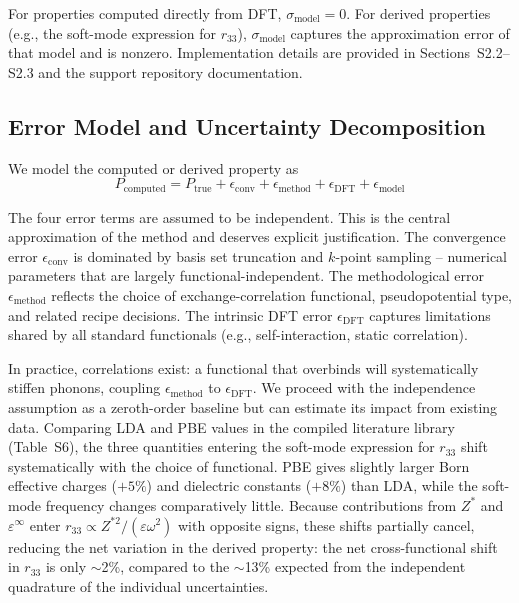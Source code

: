 \documentclass[twocolumn,superscriptaddress,amsmath,amssymb,longbibliography]{revtex4-2}
\newcommand{\conv}{\mathrm{conv}}
\newcommand{\meth}{\mathrm{method}}
\begin{document}
For properties computed directly from DFT,
$\sigma_{\mathrm{model}} = 0$. For derived properties (e.g., the soft-mode expression for $r_{33}$),
$\sigma_{\mathrm{model}}$ captures the approximation error of that model
and is nonzero. Implementation details are provided in  Sections~S2.2--S2.3 and the support repository documentation.

\subsection{Error Model and Uncertainty Decomposition}
\label{sec:decomposition}

We model the computed or derived property
as \cite{JCGM2008_GUM}
\begin{equation}
    P_{\mathrm{computed}} = P_{\mathrm{true}} + \epsilon_\conv + \epsilon_\meth + \epsilon_{\mathrm{DFT}} + \epsilon_{\mathrm{model}}
    \label{eq:error_model}
\end{equation}

The four error terms are assumed to be independent. This is
the central approximation of the method and deserves explicit
justification.
The convergence error $\epsilon_\conv$ is dominated by basis set truncation
and $k$-point sampling -- numerical parameters that are largely
functional-independent. The methodological error $\epsilon_\meth$ reflects
the choice of exchange-correlation functional, pseudopotential type, and
related recipe decisions. The intrinsic DFT error $\epsilon_{\mathrm{DFT}}$
captures limitations shared by all standard functionals (e.g.,
self-interaction, static correlation).

In practice, correlations exist:
a functional that overbinds will systematically stiffen phonons, coupling
$\epsilon_\meth$ to $\epsilon_{\mathrm{DFT}}$. We proceed with the
independence assumption as a zeroth-order baseline but can estimate its
impact from existing data. Comparing LDA and PBE values in the compiled literature
library (Table~S6), the three quantities entering the soft-mode expression for $r_{33}$ shift systematically with the choice of functional. PBE gives slightly larger Born effective charges ($+5\%$) and dielectric constants ($+8\%$) than LDA, while the soft-mode frequency changes comparatively little.  Because contributions from $Z^*$ and $\varepsilon^\infty$ enter $r_{33} \propto
Z^{*2}/(\varepsilon \omega^2)$ with opposite signs, these shifts partially cancel, reducing the net variation in the derived property: the net cross-functional shift
in $r_{33}$ is only $\sim$2\%, compared to the $\sim$13\% expected from the independent
quadrature of the individual uncertainties.
\end{document}

